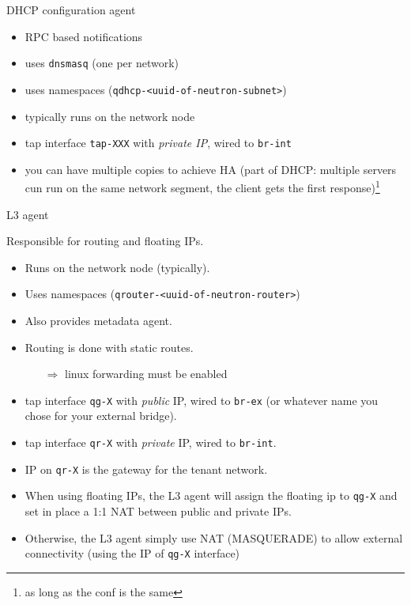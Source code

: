 \documentclass[english,serif,mathserif,xcolor=pdftex,dvipsnames,table]{beamer}
\begin{document}
\begin{frame}
  {DHCP configuration agent}
  \begin{itemize}
  \item RPC based notifications
  \item uses \texttt{dnsmasq} (one per network)
  \item uses namespaces (\texttt{qdhcp-<uuid-of-neutron-subnet>})
  \item typically runs on the network node
  \item tap interface \texttt{tap-XXX} with \textit{private IP}, wired
    to \texttt{br-int}
  \item you can have multiple copies to achieve HA (part of DHCP:
    multiple servers cun run on the same network segment, the client
    gets the first response)\footnote{as long as the conf is the same}
  \end{itemize}
\end{frame}

\begin{frame}
  {L3 agent}

  Responsible for routing and floating IPs.

\scriptsize  \begin{itemize}
  \item Runs on the network node (typically).

  \item Uses namespaces (\texttt{qrouter-<uuid-of-neutron-router>})

  \item Also provides metadata agent.

  \item Routing is done with static routes.
    \begin{itemize}\scriptsize
    \item[$\Rightarrow$] linux forwarding must be enabled
    \end{itemize}
  \item tap interface \texttt{qg-X} with \textit{public} IP, wired to
    \texttt{br-ex} (or whatever name you chose for your external bridge).

  \item tap interface \texttt{qr-X} with \textit{private} IP, wired to
    \texttt{br-int}.

  \item IP on \texttt{qr-X} is the gateway for the tenant network.

  \item When using floating IPs, the L3 agent will assign the floating
    ip to \texttt{qg-X} and set in place a 1:1 NAT between public and
    private IPs.

  \item Otherwise, the L3 agent simply use NAT (MASQUERADE) to allow
    external connectivity (using the IP of \texttt{qg-X} interface)
  \end{itemize}
\end{frame}
\end{document}

